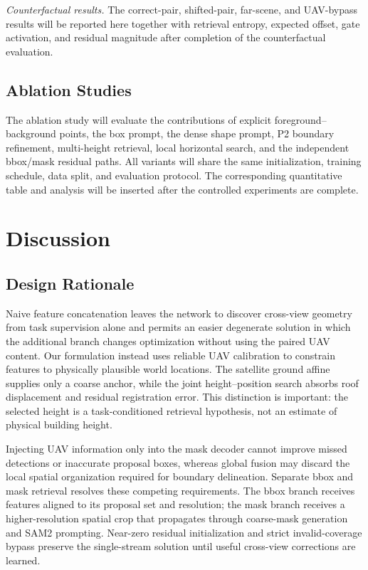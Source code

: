 \documentclass[letterpaper,journal]{IEEEtran}
\begin{document}
\noindent\textit{Counterfactual results.}
The correct-pair, shifted-pair, far-scene, and UAV-bypass results will be reported here together with retrieval entropy, expected offset, gate activation, and residual magnitude after completion of the counterfactual evaluation.

\subsection{Ablation Studies}
\label{sec:ablations}
The ablation study will evaluate the contributions of explicit foreground--background points, the box prompt, the dense shape prompt, P2 boundary refinement, multi-height retrieval, local horizontal search, and the independent bbox/mask residual paths. All variants will share the same initialization, training schedule, data split, and evaluation protocol. The corresponding quantitative table and analysis will be inserted after the controlled experiments are complete.

\section{Discussion}
\label{sec:discussion}

\subsection{Design Rationale}
Naive feature concatenation leaves the network to discover cross-view geometry from task supervision alone and permits an easier degenerate solution in which the additional branch changes optimization without using the paired UAV content. Our formulation instead uses reliable UAV calibration to constrain features to physically plausible world locations. The satellite ground affine supplies only a coarse anchor, while the joint height--position search absorbs roof displacement and residual registration error. This distinction is important: the selected height is a task-conditioned retrieval hypothesis, not an estimate of physical building height.

Injecting UAV information only into the mask decoder cannot improve missed detections or inaccurate proposal boxes, whereas global fusion may discard the local spatial organization required for boundary delineation. Separate bbox and mask retrieval resolves these competing requirements. The bbox branch receives features aligned to its proposal set and resolution; the mask branch receives a higher-resolution spatial crop that propagates through coarse-mask generation and SAM2 prompting. Near-zero residual initialization and strict invalid-coverage bypass preserve the single-stream solution until useful cross-view corrections are learned.
\end{document}
